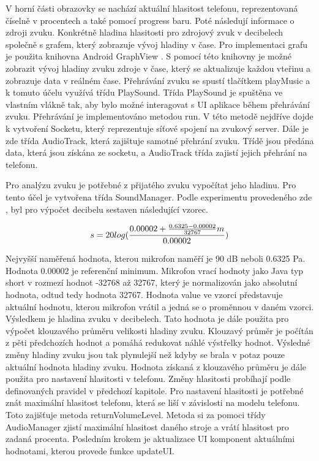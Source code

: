 \documentclass[journal, a4paper]{IEEEtran}
\begin{document}
V horní části obrazovky se nachází aktuální hlasitost telefonu, reprezentovaná číselně v procentech a také pomocí progress baru. Poté následují informace o zdroji zvuku. Konkrétně hladina hlasitosti pro zdrojový zvuk v decibelech společně s grafem, který zobrazuje vývoj hladiny v čase. Pro implementaci grafu je použita knihovna Android GraphView \cite{graphview}. S pomocí této knihovny je možné zobrazit vývoj hladiny zvuku zdroje v čase, který se aktualizuje každou vteřinu a zobrazuje data v reálném čase. Přehrávání zvuku se spustí tlačítkem playMusic a k tomuto účelu využívá třídu PlaySound. Třída PlaySound je spuštěna ve vlastním vlákně tak, aby bylo možné interagovat s UI aplikace během přehrávání zvuku. Přehrávání je implementováno metodou run. V této metodě nejdříve dojde k vytvoření Socketu, který reprezentuje síťové spojení na zvukový server. Dále je zde třída AudioTrack, která zajištuje samotné přehrání zvuku. Třídě jsou předána data, která jsou získána ze socketu, a AudioTrack třída zajistí jejich přehrání na telefonu. \par
Pro analýzu zvuku je potřebné z přijatého zvuku vypočítat jeho hladinu. Pro tento účel je vytvořena třída SoundManager. Podle experimentu provedeného zde \cite{stackoverflow}, byl pro výpočet decibelu sestaven následující vzorec. \par

\begin{equation*}
	s = 20log( \frac{0.00002+\frac{0.6325-0.00002}{32767}m\\}{0.00002})\\ 	
\end{equation*} 

Nejvyšší naměřená hodnota, kterou mikrofon naměří je 90 dB neboli 0.6325 Pa. Hodnota 0.00002 je referenční minimum. Mikrofon vrací hodnoty jako Java typ short v rozmezí hodnot -32768 až 32767, který je normalizován jako absolutní hodnota, odtud tedy hodnota 32767. Hodnota value ve vzorci představuje aktuální hodnotu, kterou mikrofon vrátil a jedná se o proměnnou v daném vzorci. Výsledkem je hladina zvuku v decibelech. Tato hodnota je dále použita pro výpočet klouzavého průměru velikosti hladiny zvuku. Klouzavý průměr je počítán z pěti předchozích hodnot a pomáhá redukovat náhlé výstřelky hodnot. Výsledné změny hladiny zvuku jsou tak plynulejší než kdyby se brala v potaz pouze aktuální hodnota hladiny zvuku. Hodnota získaná z klouzavého průměru je dále použita pro nastavení hlasitosti v telefonu. Změny hlasitosti probíhají podle definovaných pravidel v předchozí kapitole. Pro nastavení hlasitosti je potřebné znát maximální hlasitost telefonu, která se liší v závislosti na modelu telefonu. Toto zajišťuje metoda returnVolumeLevel. Metoda si za pomoci třídy AudioManager zjistí maximální hlasitost daného stroje a vrátí hlasitost pro zadaná procenta. Posledním krokem je aktualizace UI komponent aktuálními hodnotami, kterou provede funkce updateUI.
\end{document}
